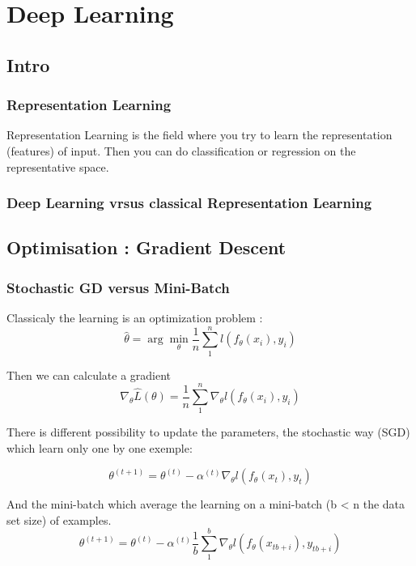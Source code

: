 \chapter{Deep Learning} %
\label{cha:deep_learning}

\section{Intro}
	\subsection{Representation Learning}

		Representation Learning is the field where you try to learn the representation (features) of input. Then you can do classification or regression on the representative space.

	\subsection{Deep Learning vrsus classical Representation Learning}


\section{Optimisation : Gradient Descent}
	\subsection{Stochastic GD versus Mini-Batch}

		Classicaly the learning is an optimization problem : 
		\[
			\hat \theta = \arg \min_\theta \frac{1}{n}\sum^n_1 l(f_\theta(x_i), y_i)
		\]

		Then we can calculate a gradient
		\[
			\nabla_\theta \hat L (\theta) = \frac{1}{n}	\sum^n_1 \nabla_\theta l(f_\theta(x_i), y_i)
		\]

		There is different possibility to update the parameters, the stochastic way (SGD) which learn only one by one exemple:

		\[
			\theta^{(t+1)} = \theta^{(t)} - \alpha^{(t)} \nabla_\theta l(f_\theta(x_{t}), y_{t})
		\]

		And the mini-batch which average the learning on a mini-batch (b < n the data set size) of examples.
		\[
			\theta^{(t+1)} = \theta^{(t)} - \alpha^{(t)} \frac{1}{b}\sum^b_1 \nabla_\theta l(f_\theta(x_{tb+i}), y_{tb+i})
		\]

